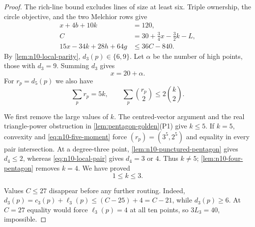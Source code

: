 \begin{proof}
The rich-line bound excludes lines of size at least six.  Triple ownership,
the circle objective, and the two Melchior rows give
\begin{align}
x+4b+10k&=120,\label{eq:n10-g5-T}\\
C&=30+\frac34x-\frac32k-L,\label{eq:n10-g5-C}\\
15x-34k+28h+64g&\le36C-840.\label{eq:n10-g5-AC}
\end{align}
By \cref{lem:n10-local-parity}, $d_3(p)\in\{6,9\}$.  Let $\alpha$ be
the number of high points, those with $d_3=9$.  Summing $d_3$ gives
\begin{equation}\label{eq:n10-high-count}
 x=20+\alpha.
\end{equation}
For $r_p=d_5(p)$ we also have
\begin{equation}\label{eq:n10-five-moment}
 \sum_pr_p=5k,\qquad
 \sum_p\binom{r_p}{2}\le2\binom k2.
\end{equation}

We first remove the large values of $k$.  The centred-vector argument and
the real triangle-power obstruction in \cref{lem:pentagon-golden}(P1) give
$k\le5$.  If $k=5$, convexity and \eqref{eq:n10-five-moment} force
$(r_p)=(3^5,2^5)$ and equality in every pair intersection.  At a
degree-three point, \cref{lem:n10-punctured-pentagon} gives $d_4\le2$,
whereas \eqref{eq:n10-local-pair} gives $d_4=3$ or $4$.  Thus $k\ne5$;
\cref{lem:n10-four-pentagon} removes $k=4$.  We have proved
\begin{equation}\label{eq:n10-kcap}
 1\le k\le3.
\end{equation}

Values $C\le27$ disappear before any further routing.  Indeed,
$d_3(p)=c_3(p)+\ell_3(p)\le(C-25)+4=C-21$, while $d_3(p)\ge6$.
At $C=27$ equality would force $\ell_3(p)=4$ at all ten points, so
$3L_3=40$, impossible.


\end{proof}

